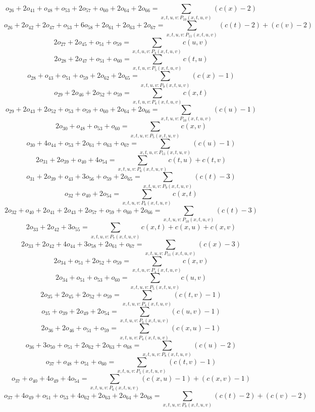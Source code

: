 \[o_{26} + 2o_{41} + o_{48} + o_{53} + 2o_{57} + o_{60} + 2o_{64} + 2o_{66} = \sum\limits_{x,t,u,v:P_{10} (x,t,u,v)} ( c( x ) - 2 ) \]
\[o_{26} + 2o_{42} + 2o_{47} + o_{53} + 6o_{58} + 2o_{61} + 2o_{63} + 2o_{67} = \sum\limits_{x,t,u,v:P_{11} (x,t,u,v)} ( c( t ) - 2 ) + ( c( v ) - 2 ) \]
\[2o_{27} + 2o_{45} + o_{51} + o_{59} = \sum\limits_{x,t,u,v:P_{4} (x,t,u,v)} c( u, v ) \]
\[2o_{28} + 2o_{47} + o_{51} + o_{60} = \sum\limits_{x,t,u,v:P_{5} (x,t,u,v)} c( t, u ) \]
\[o_{28} + o_{43} + o_{51} + o_{59} + 2o_{62} + 2o_{65} = \sum\limits_{x,t,u,v:P_{9} (x,t,u,v)} ( c( x ) - 1 ) \]
\[o_{29} + 2o_{46} + 2o_{52} + o_{59} = \sum\limits_{x,t,u,v:P_{4} (x,t,u,v)} c( x, t ) \]
\[o_{29} + 2o_{43} + 2o_{52} + o_{53} + o_{59} + o_{60} + 2o_{64} + 2o_{66} = \sum\limits_{x,t,u,v:P_{10} (x,t,u,v)} ( c( u ) - 1 ) \]
\[2o_{30} + o_{48} + o_{53} + o_{60} = \sum\limits_{x,t,u,v:P_{5} (x,t,u,v)} c( x, v ) \]
\[o_{30} + 4o_{44} + o_{53} + 2o_{61} + o_{63} + o_{67} = \sum\limits_{x,t,u,v:P_{11} (x,t,u,v)} ( c( u ) - 1 ) \]
\[2o_{31} + 2o_{39} + o_{40} + 4o_{54} = \sum\limits_{x,t,u,v:P_{6} (x,t,u,v)} c( t, u ) + c( t, v ) \]
\[o_{31} + 2o_{39} + o_{43} + 3o_{56} + o_{59} + 2o_{65} = \sum\limits_{x,t,u,v:P_{9} (x,t,u,v)} ( c( t ) - 3 ) \]
\[o_{32} + o_{40} + 2o_{54} = \sum\limits_{x,t,u,v:P_{6} (x,t,u,v)} c( x, t ) \]
\[2o_{32} + o_{40} + 2o_{41} + 2o_{43} + 2o_{57} + o_{59} + o_{60} + 2o_{66} = \sum\limits_{x,t,u,v:P_{10} (x,t,u,v)} ( c( t ) - 3 ) \]
\[2o_{33} + 2o_{42} + 3o_{55} = \sum\limits_{x,t,u,v:P_{7} (x,t,u,v)} c( x, t ) + c( x, u ) + c( x, v ) \]
\[2o_{33} + 2o_{42} + 4o_{44} + 3o_{58} + 2o_{61} + o_{67} = \sum\limits_{x,t,u,v:P_{11} (x,t,u,v)} ( c( x ) - 3 ) \]
\[2o_{34} + o_{51} + 2o_{52} + o_{59} = \sum\limits_{x,t,u,v:P_{4} (x,t,u,v)} c( x, v ) \]
\[2o_{34} + o_{51} + o_{53} + o_{60} = \sum\limits_{x,t,u,v:P_{5} (x,t,u,v)} c( u, v ) \]
\[2o_{35} + 2o_{45} + 2o_{52} + o_{59} = \sum\limits_{x,t,u,v:P_{4} (x,t,u,v)} ( c( t, v ) - 1 ) \]
\[o_{35} + o_{39} + 2o_{49} + 2o_{54} = \sum\limits_{x,t,u,v:P_{6} (x,t,u,v)} ( c( u, v ) - 1 ) \]
\[2o_{36} + 2o_{46} + o_{51} + o_{59} = \sum\limits_{x,t,u,v:P_{4} (x,t,u,v)} ( c( x, u ) - 1 ) \]
\[o_{36} + 3o_{50} + o_{51} + 2o_{62} + 2o_{63} + o_{68} = \sum\limits_{x,t,u,v:P_{8} (x,t,u,v)} ( c( u ) - 2 ) \]
\[o_{37} + o_{48} + o_{51} + o_{60} = \sum\limits_{x,t,u,v:P_{5} (x,t,u,v)} ( c( t, v ) - 1 ) \]
\[o_{37} + o_{40} + 4o_{49} + 4o_{54} = \sum\limits_{x,t,u,v:P_{6} (x,t,u,v)} ( c( x, u ) - 1 ) + ( c( x, v ) - 1 ) \]
\[o_{37} + 4o_{49} + o_{51} + o_{53} + 4o_{62} + 2o_{63} + 2o_{64} + 2o_{68} = \sum\limits_{x,t,u,v:P_{8} (x,t,u,v)} ( c( t ) - 2 ) + ( c( v ) - 2 ) \]
